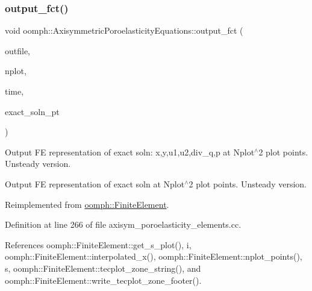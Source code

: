 \mbox{\label{classoomph_1_1AxisymmetricPoroelasticityEquations_a44ae25afaa082449111d9f2c0eb0f638}} 
\subsubsection{\texorpdfstring{output\+\_\+fct()}{output\_fct()}\hspace{0.1cm}{\footnotesize\ttfamily [2/2]}}
{\footnotesize\ttfamily void oomph\+::\+Axisymmetric\+Poroelasticity\+Equations\+::output\+\_\+fct (\begin{DoxyParamCaption}\item[{std\+::ostream \&}]{outfile,  }\item[{const unsigned \&}]{nplot,  }\item[{const double \&}]{time,  }\item[{\hyperlink{classoomph_1_1FiniteElement_ad4ecf2b61b158a4b4d351a60d23c633e}{Finite\+Element\+::\+Unsteady\+Exact\+Solution\+Fct\+Pt}}]{exact\+\_\+soln\+\_\+pt }\end{DoxyParamCaption})\hspace{0.3cm}{\ttfamily [virtual]}}



Output FE representation of exact soln\+: x,y,u1,u2,div\+\_\+q,p at Nplot$^\wedge$2 plot points. Unsteady version. 

Output FE representation of exact soln at Nplot$^\wedge$2 plot points. Unsteady version. 

Reimplemented from \hyperlink{classoomph_1_1FiniteElement_a2a8426dccd57b927be0ae0eec00d0479}{oomph\+::\+Finite\+Element}.



Definition at line 266 of file axisym\+\_\+poroelasticity\+\_\+elements.\+cc.



References oomph\+::\+Finite\+Element\+::get\+\_\+s\+\_\+plot(), i, oomph\+::\+Finite\+Element\+::interpolated\+\_\+x(), oomph\+::\+Finite\+Element\+::nplot\+\_\+points(), s, oomph\+::\+Finite\+Element\+::tecplot\+\_\+zone\+\_\+string(), and oomph\+::\+Finite\+Element\+::write\+\_\+tecplot\+\_\+zone\+\_\+footer().

